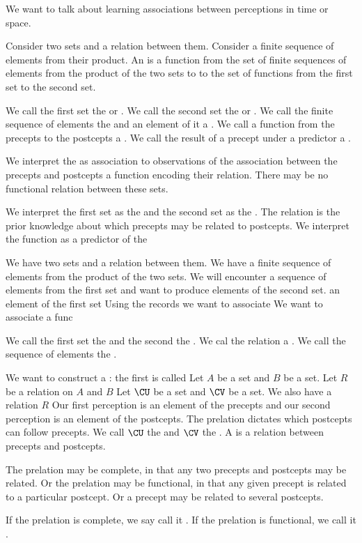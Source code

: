 
\sbasic






\sstart
{}


We want to talk about learning
associations between perceptions
in time or space.


Consider two sets
and a relation between them.
Consider a finite sequence of elements
from their product.
An  is a function
from the set of finite sequences of
elements from the product of the two
sets to to the set of functions from
the first set to the second set.

We call the first set the
 or
.
We call the second set the
 or
.
We call the finite sequence of
elements the 
and an element of it a .
We call a function from the precepts
to the postcepts a .
We call the result of a precept
under a predictor a .

We interpret the  as
association to observations of the
association between the precepts
and postcepts a function encoding
their relation. There may be no
functional relation between these
sets.

We interpret the first set
as the 
and the second set as the
. The relation
is the prior knowledge about
which precepts may be related to
postcepts.
We interpret the function as a
predictor of the



We have two sets and a relation
between them.
We have a finite sequence of
elements from the product of
the two sets.
We will encounter a sequence of
elements from the first set
and want to produce elements of
the second set.
an element
of the first set
Using the records we want to
associate
We want to associate a func

We call the first set the
 and the second the
. We cal the relation
a .
We call the sequence of elements
the .

We want to construct a
: the
first is called
Let $A$ be a set and $B$
be a set. Let $R$ be a relation
on $A$ and $B$
Let $\CU$ be a set
and $\CV$ be a set.
We also have a relation $R$
Our first perception is an
element of the precepts and
our second perception is an
element of the postcepts.
The prelation dictates which
postcepts can follow precepts.
We call $\CU$ the
and $\CV$ the .
A  is
a relation between precepts
and postcepts.


The prelation may be
complete, in that any two precepts
and postcepts may be related.
Or the prelation may
be functional, in that any given
precept is related to a particular
postcept.
Or a precept may be related
to several postcepts.

If the prelation is complete, we say
call it .
If the prelation is functional, we call
it .
\strats

